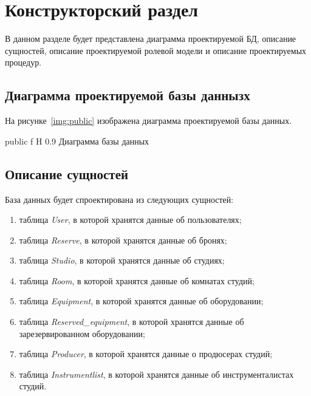 \chapter{Конструкторский раздел}

В данном разделе будет представлена диаграмма проектируемой БД, описание сущностей, описание проектируемой ролевой модели и описание проектируемых процедур.

\section{Диаграмма проектируемой базы даннызх}
На рисунке~\ref{img:public} изображена диаграмма проектируемой базы данных.


{public} %
{f} %
{H} %
{0.9\textwidth} %
{Диаграмма базы данных} %


\section{Описание сущностей}
База данных будет спроектирована из следующих сущностей:
\begin{enumerate}
	\item таблица \textit{User}, в которой хранятся данные об пользователях;
	\item таблица \textit{Reserve}, в которой хранятся данные об бронях;
	\item таблица \textit{Studio}, в которой хранятся данные об студиях;
	\item таблица \textit{Room}, в которой хранятся данные об комнатах студий;
	\item таблица \textit{Equipment}, в которой хранятся данные об оборудовании;
	\item таблица \textit{Reserved\_equipment}, в которой хранятся данные об зарезервированном оборудовании;
	\item таблица \textit{Producer}, в которой хранятся данные о продюсерах студий;
	\item таблица \textit{Instrumentlist}, в которой хранятся данные об инструменталистах студий.
\end{enumerate}
